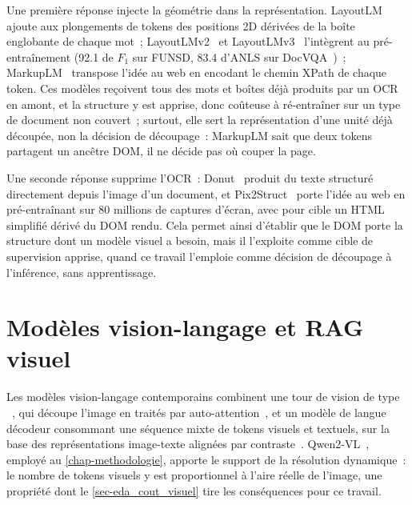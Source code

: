Une première réponse injecte la géométrie dans la représentation.
LayoutLM~\citep{layoutlm2020} ajoute aux plongements de tokens des positions 2D
dérivées de la boîte englobante de chaque mot~; LayoutLMv2~\citep{layoutlmv2_2021}
et LayoutLMv3~\citep{layoutlmv3_2022} l'intègrent au pré-entraînement (\num{92.1}
de $F_1$ sur FUNSD, \num{83.4} d'ANLS sur DocVQA~\citep{docvqa2021})~; MarkupLM~\citep{markuplm2022}
transpose l'idée au web en encodant le chemin XPath de chaque token. Ces
modèles reçoivent tous des mots et boîtes déjà produits par un OCR en amont, et
la structure y est apprise, donc coûteuse à ré-entraîner sur un type de
document non couvert~; surtout, elle sert la représentation d'une unité déjà
découpée, non la décision de découpage~: MarkupLM sait que deux tokens
partagent un ancêtre DOM, il ne décide pas où couper la page.

Une seconde réponse supprime l'OCR~: Donut~\citep{donut2022} produit du texte
structuré directement depuis l'image d'un document, et
Pix2Struct~\citep{pix2struct2023} porte l'idée au web en pré-entraînant sur
\num{80} millions de captures d'écran, avec pour cible un HTML simplifié dérivé
du DOM rendu. Cela permet ainsi d'établir que le DOM porte la structure dont un
modèle visuel a besoin, mais il l'exploite comme cible de supervision apprise,
quand ce travail l'emploie comme décision de découpage à l'inférence, sans
apprentissage.

\section{Modèles vision-langage et RAG visuel}
\label{sec-eda_ragvisuel}

Les modèles vision-langage contemporains combinent une tour de vision de type
~\citep{vit2021}, qui découpe l'image en
 traités par auto-attention~\citep{transformer2017}, et un
modèle de langue décodeur consommant une séquence mixte de tokens visuels et
textuels, sur la base des représentations image-texte alignées par
contraste~\citep{clip2021}. Qwen2-VL~\citep{qwen2vl2024}, employé au
\cref{chap-methodologie}, apporte le support de la résolution dynamique~: le
nombre de tokens visuels y est proportionnel à l'aire réelle de l'image, une
propriété dont le \cref{sec-eda_cout_visuel} tire les conséquences pour ce
travail.

